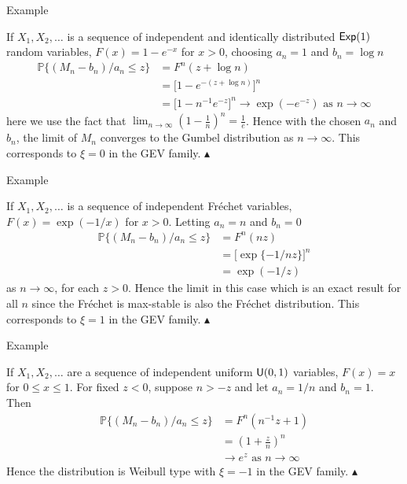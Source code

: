 \documentclass[10pt]{beamer}
\newcommand\xqed[1]{%
  \leavevmode\unskip\penalty9999 \hbox{}\nobreak\hfill
  \quad\hbox{#1}}
\newcommand\eqed{\xqed{$\blacktriangle$}}
\begin{document}
\begin{frame}{Example}
\begin{example}
If $X_1, X_2, \ldots$ is a sequence of independent and identically distributed $\text{\sffamily Exp}(1)$ random variables, $F(x) = 1-e^{-x}$ for $x>0$, choosing $a_n = 1$ and $b_n = \log n$
\begin{align*}
\mathbb{P}\{(M_n-b_n)/a_n\leq z\} &= F^n(z + \log n)\\
&= \bigg[1-e^{-(z+\log n)}\bigg]^n\\
&= \bigg[1-n^{-1}e^{-z}\bigg]^n \to \exp(-e^{-z}) \text{ as } n \to \infty
\end{align*}
here we use the fact that $\lim_{n \to \infty} \left(1-\frac{1}{n}\right)^n = \frac{1}{e}$. Hence with the chosen $a_n$ and $b_n$, the limit of $M_n$ converges to the Gumbel distribution as $n \to \infty$. This corresponds to $\xi = 0$ in the GEV family. \eqed
\end{example}
\end{frame}




\begin{frame}{Example}
\begin{example}
If $X_1, X_2, \ldots$ is a sequence of independent Fr\'echet variables, $F(x) = \exp(-1/x)$ for $x>0$. Letting $a_n = n$ and $b_n = 0$
\begin{align*}
\mathbb{P}\{(M_n-b_n)/a_n\leq z\}  & = F^n(nz)\\
& = \Big[\exp\{-1/nz\}\Big]^n\\
& = \exp(-1/z)
\end{align*}
as $n \to \infty$, for each $z>0$. Hence the limit in this case which is an exact result for all $n$ since the Fr\'echet is max-stable is also the Fr\'echet distribution. This corresponds to $\xi = 1$ in the GEV family.
\eqed
\end{example}
\end{frame}

\begin{frame}{Example}
\begin{example}
If $X_1, X_2, \ldots$ are a sequence of independent uniform $\text{\sffamily U}(0,1)$ variables, $F(x)=x$ for $0 \leq x \leq 1$. For fixed $z < 0$, suppose $n>-z$ and let $a_n = 1/n$ and $b_n = 1$. Then
\begin{align*}
\mathbb{P}\{(M_n-b_n)/a_n\leq z\} &= F^n(n^{-1}z+1)\\
&= \left(1+\frac{z}{n}\right)^n\\
&\to e^z \text{ as } n \to \infty
\end{align*}
Hence the distribution is Weibull type with $\xi=-1$ in the GEV family.
\eqed
\end{example}
\end{frame}
\end{document}
